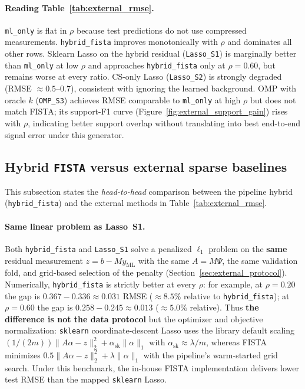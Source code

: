 \paragraph{Reading Table~\ref{tab:external_rmse}.}
\texttt{ml\_only} is flat in $\rho$ because test predictions do not use compressed measurements.
\texttt{hybrid\_fista} improves monotonically with $\rho$ and dominates all other rows.
Sklearn Lasso on the hybrid residual (\texttt{Lasso\_S1}) is marginally better than \texttt{ml\_only} at low $\rho$ and approaches \texttt{hybrid\_fista} only at $\rho=0.60$, but remains worse at every ratio.
CS-only Lasso (\texttt{Lasso\_S2}) is strongly degraded (RMSE ${\approx}0.5$--$0.7$), consistent with ignoring the learned background.
OMP with oracle $k$ (\texttt{OMP\_S3}) achieves RMSE comparable to \texttt{ml\_only} at high $\rho$ but does not match FISTA; its support-F1 curve (Figure~\ref{fig:external_support_gain}) rises with $\rho$, indicating better support overlap without translating into best end-to-end signal error under this generator.

\subsection{Hybrid \texttt{FISTA} versus external sparse baselines}
\label{sec:external_vs_hybrid}

This subsection states the \emph{head-to-head} comparison between the pipeline hybrid (\texttt{hybrid\_fista}) and the external methods in Table~\ref{tab:external_rmse}.

\paragraph{Same linear problem as Lasso~S1.}
Both \texttt{hybrid\_fista} and \texttt{Lasso\_S1} solve a penalized $\ell_1$ problem on the \textbf{same} residual measurement $z=b-My_{\mathrm{ML}}$ with the same $A=M\Psi$, the same validation fold, and grid-based selection of the penalty (Section~\ref{sec:external_protocol}).
Numerically, \texttt{hybrid\_fista} is strictly better at every $\rho$: for example, at $\rho=0.20$ the gap is $0.367-0.336\approx 0.031$ RMSE ($\approx 8.5\%$ relative to \texttt{hybrid\_fista}); at $\rho=0.60$ the gap is $0.258-0.245\approx 0.013$ ($\approx 5.0\%$ relative).
Thus \textbf{the difference is not the data protocol} but the optimizer and objective normalization: \texttt{sklearn} coordinate-descent Lasso uses the library default scaling $(1/(2m))\|A\alpha-z\|_2^2+\alpha_{\mathrm{sk}}\|\alpha\|_1$ with $\alpha_{\mathrm{sk}}\approx\lambda/m$, whereas FISTA minimizes $0.5\|A\alpha-z\|_2^2+\lambda\|\alpha\|_1$ with the pipeline's warm-started grid search.
Under this benchmark, the in-house FISTA implementation delivers lower test RMSE than the mapped \texttt{sklearn} Lasso.

